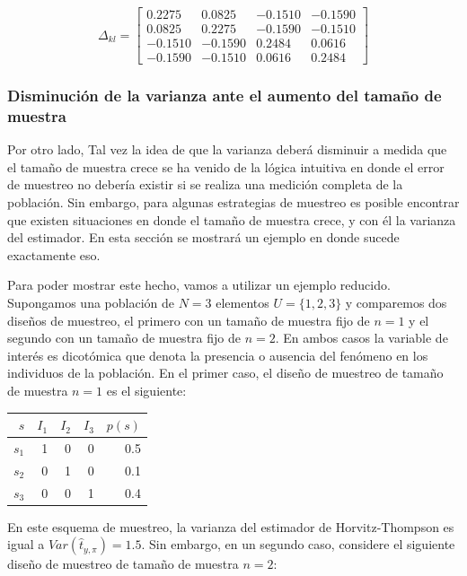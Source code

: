 \documentclass[
  12pt,
  spanish,
]{book}
\begin{document}
\[
\Delta_{kl} =
\begin{bmatrix}
0.2275  & 0.0825  & -0.1510 & -0.1590 \\
0.0825  & 0.2275  & -0.1590 & -0.1510 \\
-0.1510 & -0.1590 & 0.2484  & 0.0616 \\
-0.1590 & -0.1510 & 0.0616  &  0.2484
\end{bmatrix}
\]

\hypertarget{disminuciuxf3n-de-la-varianza-ante-el-aumento-del-tamauxf1o-de-muestra}{%
\subsubsection*{Disminución de la varianza ante el aumento del tamaño de muestra}\label{disminuciuxf3n-de-la-varianza-ante-el-aumento-del-tamauxf1o-de-muestra}}

Por otro lado, Tal vez la idea de que la varianza deberá disminuir a medida que el tamaño de muestra crece se ha venido de la lógica intuitiva en donde el error de muestreo no debería existir si se realiza una medición completa de la población. Sin embargo, para algunas estrategias de muestreo es posible encontrar que existen situaciones en donde el tamaño de muestra crece, y con él la varianza del estimador. En esta sección se mostrará un ejemplo en donde sucede exactamente eso.

Para poder mostrar este hecho, vamos a utilizar un ejemplo reducido. Supongamos una población de \(N = 3\) elementos \(U=\{1, 2, 3\}\) y comparemos dos diseños de muestreo, el primero con un tamaño de muestra fijo de \(n=1\) y el segundo con un tamaño de muestra fijo de \(n=2\). En ambos casos la variable de interés es dicotómica que denota la presencia o ausencia del fenómeno en los individuos de la población. En el primer caso, el diseño de muestreo de tamaño de muestra \(n=1\) es el siguiente:

\begin{longtable}[]{@{}rrrrr@{}}
\toprule
\(s\) & \(I_1\) & \(I_2\) & \(I_3\) & \(p(s)\) \\
\midrule
\endhead
\(s_1\) & 1 & 0 & 0 & 0.5 \\
\(s_2\) & 0 & 1 & 0 & 0.1 \\
\(s_3\) & 0 & 0 & 1 & 0.4 \\
\bottomrule
\end{longtable}

En este esquema de muestreo, la varianza del estimador de Horvitz-Thompson es igual a \(Var(\hat t_{y, \pi}) = 1.5\). Sin embargo, en un segundo caso, considere el siguiente diseño de muestreo de tamaño de muestra \(n=2\):
\end{document}
